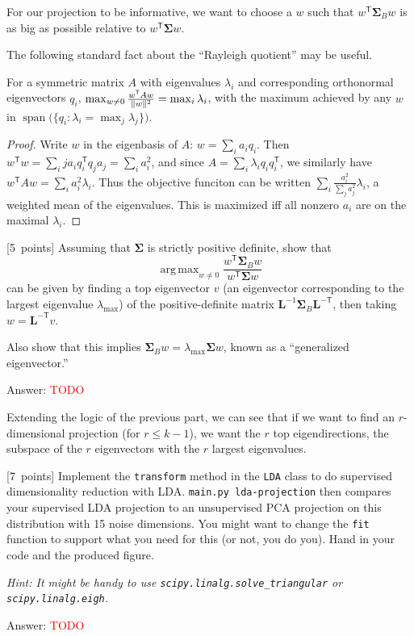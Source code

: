 \documentclass{article}
\newcommand{\ask}[1]{\textcolor{question}{#1}}
\newenvironment{answer}{\par\begingroup\color{answer}Answer: }{\endgroup}
\newcommand{\red}[1]{\textcolor{red}{#1}}
\newcommand{\pts}[1]{\textcolor{points}{[#1~points]}}
\newcommand{\hint}[1]{\textcolor{black!60!white}{\emph{Hint: #1}}}
\newcommand{\TODO}{\red{TODO}}
\DeclareMathOperator*{\argmax}{arg\,max}
\newcommand{\bSigma}{\boldsymbol{\Sigma}}
\newcommand{\bL}{\mathbf{L}}
\newcommand{\tp}{^\mathsf{T}}
\newcommand{\mtp}{^{-\mathsf{T}}}
\DeclarePairedDelimiter{\norm}{\lVert}{\rVert}
\numberwithin{equation}{section}
\begin{document}
For our projection to be informative,
we want to choose a $w$ such that $w\tp \bSigma_B w$ is as big as possible
relative to $w\tp \bSigma w$.

The following standard fact about the ``Rayleigh quotient'' may be useful.
\begin{lemma} \label{thm:rayleigh}
    For a symmetric matrix $A$ with eigenvalues $\lambda_i$ and corresponding orthonormal eigenvectors $q_i$,
    $\max_{w \ne 0} \frac{w\tp A w}{\norm w^2} = \max_i \lambda_i$,
    with the maximum achieved by any $w$
    in $\operatorname{span}\bigl( \{ q_i : \lambda_i = \max_j \lambda_j \} \bigr)$.
\end{lemma}
\begin{proof}
    Write $w$ in the eigenbasis of $A$:
    $w = \sum_i a_i q_i$.
    Then $w\tp w = \sum_ij a_i q_i\tp q_j a_j = \sum_i a_i^2$,
    and since $A = \sum_i \lambda_i q_i q_i\tp$,
    we similarly have $w\tp A w = \sum_i a_i^2 \lambda_i$.
    Thus the objective funciton can be written $\sum_i \frac{a_i^2}{\sum_j a_j^2} \lambda_i$,
    a weighted mean of the eigenvalues.
    This is maximized iff all nonzero $a_i$ are on the maximal $\lambda_i$.
\end{proof}

\begin{qlist}[resume]
\item \pts{5}
Assuming that $\bSigma$ is strictly positive definite,
\ask{show that}
\[
    \argmax_{w \ne 0} \frac{w\tp \bSigma_B w}{w\tp \bSigma w}
\]
can be given by finding a top eigenvector $v$
(an eigenvector corresponding to the largest eigenvalue $\lambda_{\max}$)
of the positive-definite matrix $\bL^{-1} \bSigma_B \bL\mtp$,
then taking $w = \bL\mtp v$.

Also \ask{show that this implies $\bSigma_B w = \lambda_{\max} \bSigma w$},
known as a ``generalized eigenvector.''

\begin{answer}\TODO\end{answer}
\end{qlist}

Extending the logic of the previous part,
we can see that if we want to find an $r$-dimensional projection (for $r \le k-1$),
we want the $r$ top eigendirections,
the subspace of the $r$ eigenvectors with the $r$ largest eigenvalues.

\begin{qlist}[resume]
\item \pts{7}
Implement the \texttt{transform} method in the \texttt{LDA} class
to do supervised dimensionality reduction with LDA.
\texttt{main.py lda-projection}
then compares your supervised LDA projection
to an unsupervised PCA projection
on this distribution with 15 noise dimensions.
You might want to change the \texttt{fit} function to support what you need for this (or not, you do you).
\ask{Hand in your code and the produced figure.}

\hint{It might be handy to use \texttt{scipy.linalg.solve\_triangular} or \texttt{scipy.linalg.eigh}.}

\begin{answer}\TODO\end{answer}

\end{qlist}
\end{document}

